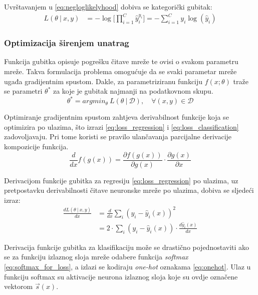 \documentclass[times, utf8, numeric, diplomski]{fer}
\def\pfrac#1#2{\frac{\partial #1}{\partial #2}}
\def\dfrac#1#2{\frac{d #1}{d #2}}
\def\probsep{\ |\ }
\def\dataset{\mathcal{D}}
\begin{document}
Uvrštavanjem u \ref{eq:negloglikelyhood} dobiva se kategorički gubitak:
\begin{align}
\label{eq:loss_classification}
L(\theta \probsep x,y) &= - \log \Big[ \prod_{i=1}^C \hat{y}_i^{y_i} \Big] = - \sum_{i=1}^C y_i \log (\hat{y}_i)
\end{align}

\subsubsection{Optimizacija širenjem unatrag}
\label{sec:backprop}
Funkcija gubitka opisuje pogrešku čitave mreže te ovisi o svakom parametru mreže. Takva formulacija problema omogućuje da se svaki parametar mreže ugađa gradijentnim spustom. Dakle, za parametriziranu funkciju $f(x;\theta)$ traže se parametri $\theta^*$ za koje je gubitak najmanji na podatkovnom skupu.
\begin{equation}
\theta^* = argmin_\theta\ L(\theta \probsep \dataset), \quad \forall (x,y) \in \dataset
\end{equation}

Optimiranje gradijentnim spustom zahtjeva derivabilnost funkcije koja se optimizira po ulazima, što izrazi \eqref{eq:loss_regression} i \eqref{eq:loss_classification} zadovoljavaju. Pri tome koristi se pravilo ulančavanja parcijalne derivacije kompozicije funkcija.
\begin{equation}
\label{eq:partial_rule}
\dfrac{}{x} f(g(x)) = \pfrac{f(g(x))}{g(x)} \cdot \pfrac{g(x)}{x}
\end{equation}

Derivacijom funkcije gubitka za regresiju \eqref{eq:loss_regression} po ulazima, uz pretpostavku derivabilnosti čitave neuronske mreže po ulazima, dobiva se sljedeći izraz:
\begin{align}
\dfrac{L(\theta \probsep x,y)}{x} &= \dfrac{}{x}\sum_i(y_i - \hat{y}_i(x))^2 \nonumber \\
&= 2 \cdot \sum_i (y_i - \hat{y}_i(x)) \cdot \dfrac{\hat{y}_i(x)}{x}
\end{align}

Derivacija funkcije gubitka za klasifikaciju može se drastično pojednostaviti ako se za funkciju izlaznog sloja mreže odabere funkcija \textit{softmax} \eqref{eq:softmax_for_loss}, a izlazi se kodiraju \textit{one-hot} oznakama \eqref{eq:onehot}. Ulaz u funkciju softmax su aktivacije neurona izlaznog sloja koje su ovdje označene vektorom $\vec{s}(x)$.

\newpage
\end{document}

